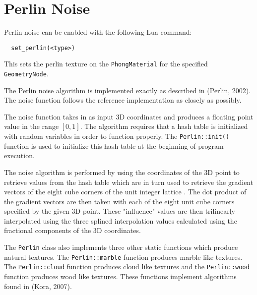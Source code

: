 \section{Perlin Noise}

Perlin noise can be enabled with the following Lua command:
\begin{lstlisting}
  set_perlin(<type>)
\end{lstlisting}
This sets the perlin texture on the \verb|PhongMaterial| for the specified 
\verb|GeometryNode|.

The Perlin noise algorithm is implemented exactly as described in (Perlin,
2002). The noise function follows the reference implementation as closely as
possibly.

The noise function takes in as input 3D coordinates and produces a floating
point value in the range $[0, 1]$. The algorithm requires that a hash table is
initialized with random variables in order to function properly. The
\verb|Perlin::init()| function is used to initialize this hash table at the
beginning of program execution.

The noise algorithm is performed by using the coordinates of the 3D point to 
retrieve values from the hash table which are in turn used to retrieve the 
gradient vectors of the eight cube corners of the unit integer lattice . The dot 
product of the gradient vectors are then taken with each of the eight unit cube 
corners specified by the given 3D point. These "influence" values are then
trilinearly interpolated using  the three splined interpolation values 
calculated using the fractional components of the 3D coordinates. 

The \verb|Perlin| class also implements three other static functions which
produce natural textures. The \verb|Perlin::marble| function produces marble
like textures. The \verb|Perlin::cloud| function produces cloud like textures
and the \verb|Perlin::wood| function produces wood like textures. These
functions implement algorithms found in (Kora, 2007). 

